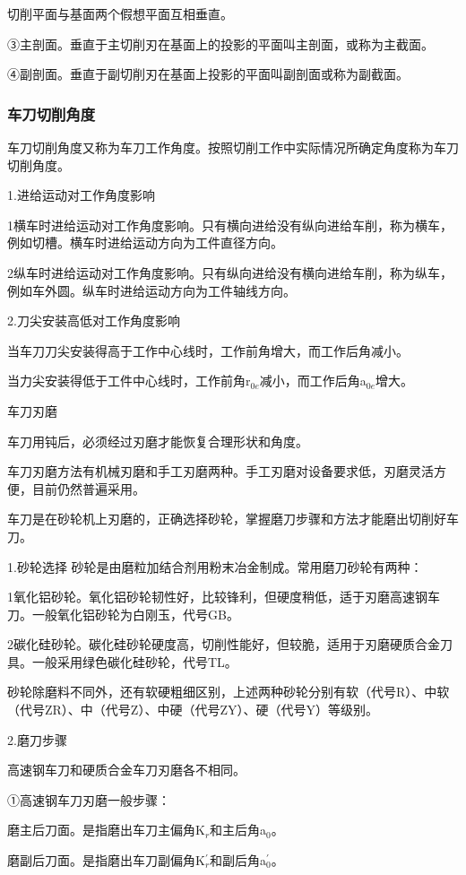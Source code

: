 \documentclass{ctexbook}
\begin{document}
切削平面与基面两个假想平面互相垂直。

③主剖面。垂直于主切削刃在基面上的投影的平面叫主剖面，或称为主截面。

④副剖面。垂直于副切削刃在基面上投影的平面叫副剖面或称为副截面。
\subsubsection{车刀切削角度}
车刀切削角度又称为车刀工作角度。按照切削工作中实际情况所确定角度称为车刀切削角度。

1.进给运动对工作角度影响

1横车时进给运动对工作角度影响。只有横向进给没有纵向进给车削，称为横车，例如切槽。横车时进给运动方向为工件直径方向。

2纵车时进给运动对工作角度影响。只有纵向进给没有横向进给车削，称为纵车，例如车外圆。纵车时进给运动方向为工件轴线方向。

2.刀尖安装高低对工作角度影响

当车刀刀尖安装得高于工作中心线时，工作前角增大，而工作后角减小。

当力尖安装得低于工件中心线时，工作前角r$_{0e}$减小，而工作后角a$_{0e}$增大。

车刀刃磨

车刀用钝后，必须经过刃磨才能恢复合理形状和角度。

车刀刃磨方法有机械刃磨和手工刃磨两种。手工刃磨对设备要求低，刃磨灵活方便，目前仍然普遍采用。

车刀是在砂轮机上刃磨的，正确选择砂轮，掌握磨刀步骤和方法才能磨出切削好车刀。

1.砂轮选择
砂轮是由磨粒加结合剂用粉末冶金制成。常用磨刀砂轮有两种：

1氧化铝砂轮。氧化铝砂轮韧性好，比较锋利，但硬度稍低，适于刃磨高速钢车刀。一般氧化铝砂轮为白刚玉，代号GB。

2碳化硅砂轮。碳化硅砂轮硬度高，切削性能好，但较脆，适用于刃磨硬质合金刀具。一般采用绿色碳化硅砂轮，代号TL。

砂轮除磨料不同外，还有软硬粗细区别，上述两种砂轮分别有软（代号R）、中软（代号ZR）、中（代号Z）、中硬（代号ZY）、硬（代号Y）等级别。

2.磨刀步骤

高速钢车刀和硬质合金车刀刃磨各不相同。

①高速钢车刀刃磨一般步骤：

磨主后刀面。是指磨出车刀主偏角K$_r$和主后角a$_0$。

磨副后刀面。是指磨出车刀副偏角K$^{\prime}_{r}$和副后角a$^{\prime}_{0}$。
\end{document}
